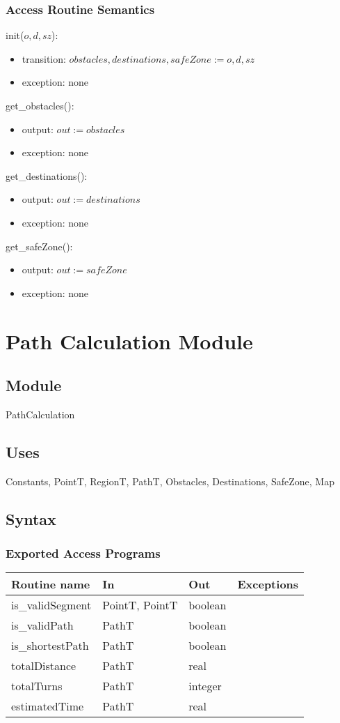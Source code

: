 \documentclass[12pt]{article}
\begin{document}
\subsubsection* {Access Routine Semantics}
\noindent init($o, d, sz$):
\begin{itemize}
\item transition: $\mathit{obstacles}, \mathit{destinations}, \mathit{safeZone}  := o, d, sz$
\item exception: none
\end{itemize}
\noindent get\_obstacles():
\begin{itemize}
\item output: $\mathit{out} := \mathit{obstacles}$
\item exception: none
\end{itemize}
\noindent get\_destinations():
\begin{itemize}
\item output: $\mathit{out} := \mathit{destinations}$
\item exception: none
\end{itemize}
\noindent get\_safeZone():
\begin{itemize}
\item output: $\mathit{out} := \mathit{safeZone}$
\item exception: none
\end{itemize}
\newpage
\section* {Path Calculation Module}
\subsection* {Module}
PathCalculation
\subsection* {Uses}
Constants, PointT, RegionT, PathT, Obstacles, Destinations, SafeZone, Map
\subsection* {Syntax}
\subsubsection* {Exported Access Programs}
\begin{tabular}{| l | l | l | l |}
\hline
\textbf{Routine name} & \textbf{In} & \textbf{Out} & \textbf{Exceptions}\\
\hline
is\_validSegment & PointT, PointT & boolean & ~\\
\hline
is\_validPath & PathT & boolean & ~\\
\hline
is\_shortestPath & PathT & boolean & ~\\
\hline
totalDistance & PathT & real & ~\\
\hline
totalTurns & PathT & integer & ~\\
\hline
estimatedTime & PathT & real & ~\\
\hline
\end{tabular}
\end{document}
